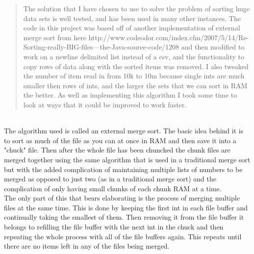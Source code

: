 \documentclass[11pt]{article}
\begin{document}
	\renewcommand{\headrulewidth}{0.4pt}
	\setlength{\headheight}{38.0pt}

	\begin{abstract}
	The solution that I have chosen to use to solve the problem of sorting huge data sets is well tested, and has been used in many other instances. The code in this project was based off of another implementation of external merge sort from here http://www.codeodor.com/index.cfm/2007/5/14/Re-Sorting-really-BIG-files---the-Java-source-code/1208 and then modified to work on a newline delimited list instead of a csv, and the functionality to copy rows of data along with the sorted items was removed. I also tweaked the number of item read in from 10k to 10m because single ints are much smaller then rows of ints, and the larger the sets that we can sort in RAM the better. As well as implementing this algorithm I took some time to look at ways that it could be improved to work faster.
	\end{abstract}
	
	\\
	
	The algorithm used is called an external merge sort. The basic idea behind it is to sort as much of the file as you can at once in RAM and then save it into a "chuck" file. Then after the whole file has been chuncked the chunk files are merged together using the same algorithm that is used in a traditional merge sort but with the added complication of maintaining multiple lists of numbers to be merged as opposed to just two (as in a traditional merge sort) and the complication of only having small chunks of each chunk RAM at a time.\\
	
	The only part of this that bears elaborating is the process of merging multiple files at the same time. This is done by keeping the first int in each file buffer and continually taking the smallest of them. Then removing it from the file buffer it belongs to refilling the file buffer with the next int in the chuck and then repeating the whole process with all of the file buffers again. This repeats until there are no items left in any of the files being merged.\\
	
	\\
	
\end{document}
